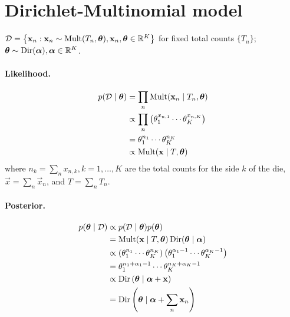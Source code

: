 \section{Dirichlet-Multinomial model}
$\mathcal D = \left\{\boldsymbol{\mathbf{x}}_n : \boldsymbol{\mathbf{x}}_n \sim \operatorname{Mult}(T_n, \boldsymbol{\mathbf{\theta}}), \boldsymbol{\mathbf{x}}_n, \boldsymbol{\mathbf{\theta}} \in \mathbb R^K \right\}$ for fixed total counts $\{T_n\}$; $\boldsymbol{\mathbf{\theta}} \sim \operatorname{Dir}(\boldsymbol{\mathbf{\alpha}}), \boldsymbol{\mathbf{\alpha}} \in \mathbb R^K$.

\paragraph{Likelihood.}
    \begin{align*}
        p(\mathcal D \mid \boldsymbol{\mathbf{\theta}})  &= \prod_n \operatorname{Mult}(\boldsymbol{\mathbf{x}}_n \mid T_n, \boldsymbol{\mathbf{\theta}}) \\
                                        &\propto \prod_n \left(\theta_1^{x_{n, 1}} \cdots \theta_K^{x_{n, K}}\right) \\
                                        &= \theta_1^{n_1} \cdots \theta_K^{n_K} \\
                                        &\propto \operatorname{Mult}(\boldsymbol{\mathbf{x}} \mid T, \boldsymbol{\mathbf{\theta}})
    \end{align*}
    where $n_k = \sum_n x_{n, k}, k = 1, \dotsc, K$ are the total counts for the side $k$ of the die, $\vec x = \sum_n \vec x_n$, and $T = \sum_n T_n$.

\paragraph{Posterior.}
    \begin{align}
        p(\boldsymbol{\mathbf{\theta}} \mid \mathcal D)  &\propto p(\mathcal D \mid \boldsymbol{\mathbf{\theta}}) p(\boldsymbol{\mathbf{\theta}}) \nonumber\\
                                        &= \operatorname{Mult}(\boldsymbol{\mathbf{x}} \mid T, \boldsymbol{\mathbf{\theta}}) \operatorname{Dir}(\boldsymbol{\mathbf{\theta}} \mid \boldsymbol{\mathbf{\alpha}}) \nonumber\\
                                        &\propto \left(\theta_1^{n_1} \cdots \theta_K^{n_K}\right) \left(\theta_1^{\alpha_1 - 1} \cdots \theta_K^{\alpha_K - 1}\right) \nonumber\\
                                        &= \theta_1^{n_1 + \alpha_1 - 1} \cdots \theta_K^{n_K + \alpha_K - 1} \nonumber\\
                                        &\propto \operatorname{Dir}\left(\boldsymbol{\mathbf{\theta}} \mid \boldsymbol{\mathbf{\alpha}} + \boldsymbol{\mathbf{x}}\right) \nonumber\\
                                        &= \operatorname{Dir}\left(\boldsymbol{\mathbf{\theta}} \mid \boldsymbol{\mathbf{\alpha}} + \sum_n \boldsymbol{\mathbf{x}}_n\right) \label{eqn:par-est/dir-mult/posterior}
    \end{align}

